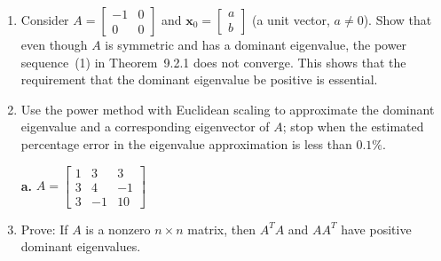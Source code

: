 \documentclass{article}
\begin{document}
\begin{enumerate}
  \item[11.] Consider $A = \begin{bmatrix}-1&0\\0&0\end{bmatrix}$ and
        $\mathbf{x}_0 = \begin{bmatrix}a\\b\end{bmatrix}$ (a unit vector, $a\ne 0$).
        Show that even though $A$ is symmetric and has a dominant eigenvalue, the
        power sequence~(1) in Theorem~9.2.1 does not converge. This shows that the
        requirement that the dominant eigenvalue be positive is essential.

  \item[12.] Use the power method with Euclidean scaling to approximate the dominant
        eigenvalue and a corresponding eigenvector of $A$; stop when the estimated
        percentage error in the eigenvalue approximation is less than $0.1\%$.

        \textbf{a.} $A = \begin{bmatrix}1&3&3\\3&4&-1\\3&-1&10\end{bmatrix}$

  \item[15.] Prove: If $A$ is a nonzero $n\times n$ matrix, then $A^TA$ and $AA^T$ have
        positive dominant eigenvalues.

\end{enumerate}
\end{document}
